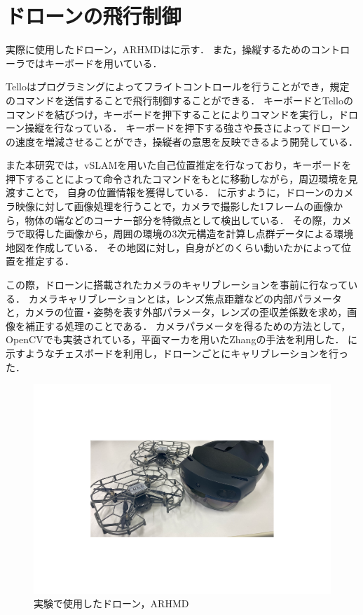 \documentclass[a4paper,11pt]{ujreport}
\begin{document}
\section{ドローンの飛行制御}
\label{sec:ControlDrone}

実際に使用したドローン，ARHMDはに示す．
また，操縦するためのコントローラではキーボードを用いている．

Telloはプログラミングによってフライトコントロールを行うことができ，規定のコマンドを送信することで飛行制御することができる．
キーボードとTelloのコマンドを結びつけ，キーボードを押下することによりコマンドを実行し，ドローン操縦を行なっている．
キーボードを押下する強さや長さによってドローンの速度を増減させることができ，操縦者の意思を反映できるよう開発している．

また本研究では，vSLAMを用いた自己位置推定を行なっており，キーボードを押下することによって命令されたコマンドをもとに移動しながら，周辺環境を見渡すことで，
自身の位置情報を獲得している．
に示すように，ドローンのカメラ映像に対して画像処理を行うことで，カメラで撮影した1フレームの画像から，物体の端などのコーナー部分を特徴点として検出している．
その際，カメラで取得した画像から，周囲の環境の3次元構造を計算し点群データによる環境地図を作成している．
その地図に対し，自身がどのくらい動いたかによって位置を推定する．

この際，ドローンに搭載されたカメラのキャリブレーションを事前に行なっている．
カメラキャリブレーションとは，レンズ焦点距離などの内部パラメータと，カメラの位置・姿勢を表す外部パラメータ，レンズの歪収差係数を求め，画像を補正する処理のことである．
カメラパラメータを得るための方法として，OpenCV\cite{article-opencv}でも実装されている，平面マーカを用いたZhangの手法\cite{article-zhang}を利用した．
に示すようなチェスボードを利用し，ドローンごとにキャリブレーションを行った．



\begin{figure}[!tb]
  \centering
  \includegraphics[width=0.7\linewidth]{img/04_drone.pdf}
  \caption{実験で使用したドローン，ARHMD}
  \label{fig:04_drone}
\end{figure}
\end{document}
